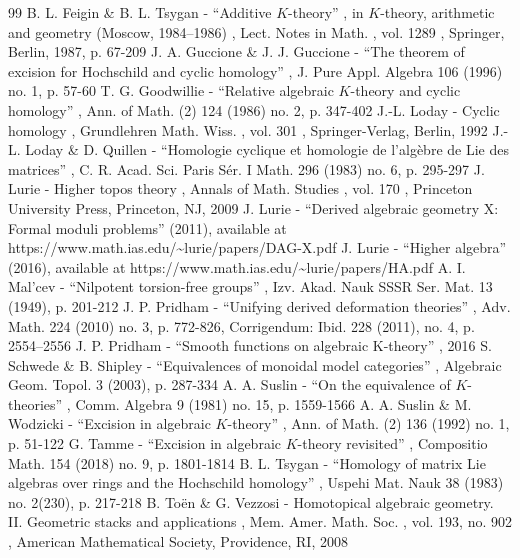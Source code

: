 \documentclass[11pt]{article}
\begin{document}
\begin{thebibliography}{99}
 B. L. Feigin \& B. L. Tsygan - “Additive $K$-theory” , in $K$-theory, arithmetic and geometry (Moscow, 1984–1986) , Lect. Notes in Math. , vol. 1289 , Springer, Berlin, 1987, p. 67-209
 J. A. Guccione \& J. J. Guccione - “The theorem of excision for Hochschild and cyclic homology” , J. Pure Appl. Algebra 106 (1996) no. 1, p. 57-60
 T. G. Goodwillie - “Relative algebraic $K$-theory and cyclic homology” , Ann. of Math. (2) 124 (1986) no. 2, p. 347-402
 J.-L. Loday - Cyclic homology , Grundlehren Math. Wiss. , vol. 301 , Springer-Verlag, Berlin, 1992
 J.-L. Loday \& D. Quillen - “Homologie cyclique et homologie de l’algèbre de Lie des matrices” , C. R. Acad. Sci. Paris Sér. I Math. 296 (1983) no. 6, p. 295-297
 J. Lurie - Higher topos theory , Annals of Math. Studies , vol. 170 , Princeton University Press, Princeton, NJ, 2009
 J. Lurie - “Derived algebraic geometry X: Formal moduli problems” (2011), available at https://www.math.ias.edu/\textasciitilde{}lurie/papers/DAG-X.pdf
 J. Lurie - “Higher algebra” (2016), available at https://www.math.ias.edu/\textasciitilde{}lurie/papers/HA.pdf
 A. I. Mal’cev - “Nilpotent torsion-free groups” , Izv. Akad. Nauk SSSR Ser. Mat. 13 (1949), p. 201-212
 J. P. Pridham - “Unifying derived deformation theories” , Adv. Math. 224 (2010) no. 3, p. 772-826, Corrigendum: Ibid. 228 (2011), no. 4, p. 2554–2556
 J. P. Pridham - “Smooth functions on algebraic K-theory” , 2016
 S. Schwede \& B. Shipley - “Equivalences of monoidal model categories” , Algebraic Geom. Topol. 3 (2003), p. 287-334
 A. A. Suslin - “On the equivalence of $K$-theories” , Comm. Algebra 9 (1981) no. 15, p. 1559-1566
 A. A. Suslin \& M. Wodzicki - “Excision in algebraic $K$-theory” , Ann. of Math. (2) 136 (1992) no. 1, p. 51-122
 G. Tamme - “Excision in algebraic $K$-theory revisited” , Compositio Math. 154 (2018) no. 9, p. 1801-1814
 B. L. Tsygan - “Homology of matrix Lie algebras over rings and the Hochschild homology” , Uspehi Mat. Nauk 38 (1983) no. 2(230), p. 217-218
 B. Toën \& G. Vezzosi - Homotopical algebraic geometry. II. Geometric stacks and applications , Mem. Amer. Math. Soc. , vol. 193, no. 902 , American Mathematical Society, Providence, RI, 2008

\end{thebibliography}
\end{document}
